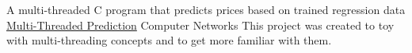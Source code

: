 \begin{cventries}
    \cventry
    {A multi-threaded C program that predicts prices based on trained regression data} %
    { \href{https://github.com/kamali-sina/Multi-Threaded-Prediction}{Multi-Threaded Prediction} } %
    {Computer Networks} %
    {} %
    {
      This project was created to toy with multi-threading concepts and to get more familiar with them.
    }

    

\end{cventries}
